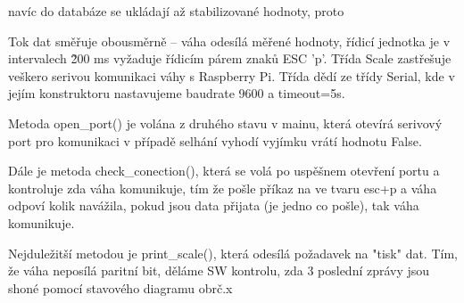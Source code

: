 navíc do databáze se ukládají až stabilizované hodnoty, proto




Tok dat směřuje obousměrně – váha odesílá měřené hodnoty, řídicí jednotka je v intervalech \~200 ms vyžaduje řídicím párem znaků ESC 'p'. Třída Scale zastřešuje veškero serivou komunikaci váhy s Raspberry Pi. Třída dědí ze třídy Serial, kde v jejím konstruktoru nastavujeme baudrate 9600 a timeout=5s. 

Metoda open\_port() je volána z druhého stavu v mainu, která otevírá serivový port pro komunikaci v případě selhání vyhodí vyjímku vrátí hodnotu False.

Dále je metoda check\_conection(), která se volá po uspěšnem otevření portu a kontroluje zda váha komunikuje, tím že pošle příkaz na ve tvaru esc+p a váha odpoví kolik navážila, pokud jsou data přijata (je jedno co pošle), tak váha komunikuje.

Nejduležitší metodou je print\_scale(), která odesílá požadavek na "tisk" dat. Tím, že váha neposílá paritní bit, děláme SW kontrolu, zda 3 poslední zprávy jsou shoné pomocí stavového diagramu obrč.x

